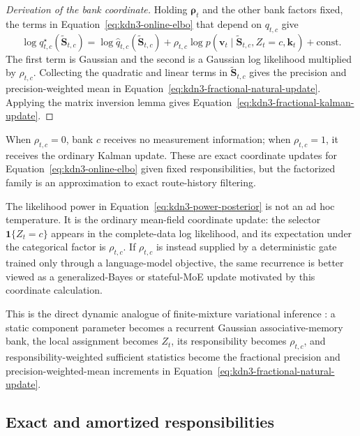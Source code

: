 \documentclass[11pt]{article}
\newcommand{\ve}[1]{\boldsymbol{#1}}
\begin{document}
\begin{proof}[Derivation of the bank coordinate]
Holding $\ve{\rho}_t$ and the other bank factors fixed, the terms in
Equation~\eqref{eq:kdn3-online-elbo} that depend on $q_{t,c}$ give
\begin{equation}
  \log q_{t,c}^{\star}(\widetilde{\ve{S}}_{t,c})
  =
  \log\widehat q_{t,c}(\widetilde{\ve{S}}_{t,c})
  +\rho_{t,c}
   \log p(\ve{v}_t\mid
     \widetilde{\ve{S}}_{t,c},Z_t=c,\ve{k}_t)
  +\mathrm{const}.
  \label{eq:kdn3-bank-coordinate-proof}
\end{equation}
The first term is Gaussian and the second is a Gaussian log likelihood multiplied by
$\rho_{t,c}$.  Collecting the quadratic and linear terms in
$\widetilde{\ve{S}}_{t,c}$ gives the precision and precision-weighted mean in
Equation~\eqref{eq:kdn3-fractional-natural-update}.  Applying the matrix inversion lemma gives
Equation~\eqref{eq:kdn3-fractional-kalman-update}.
\end{proof}

When $\rho_{t,c}=0$, bank $c$ receives no measurement information; when
$\rho_{t,c}=1$, it receives the ordinary Kalman update.  These are exact coordinate updates for
Equation~\eqref{eq:kdn3-online-elbo} given fixed responsibilities, but the factorized family is an
approximation to exact route-history filtering.

The likelihood power in Equation~\eqref{eq:kdn3-power-posterior} is not an ad hoc temperature.
It is the ordinary mean-field coordinate update: the selector
$\mathbf{1}\{Z_t=c\}$ appears in the complete-data log likelihood, and its expectation under the
categorical factor is $\rho_{t,c}$.  If $\rho_{t,c}$ is instead supplied by a deterministic gate
trained only through a language-model objective, the same recurrence is better viewed as a
generalized-Bayes or stateful-MoE update motivated by this coordinate calculation.

This is the direct dynamic analogue of finite-mixture variational inference
\cite{blei2017variational}: a static component parameter becomes a recurrent Gaussian
associative-memory bank, the local assignment becomes
$Z_t$, its responsibility becomes $\rho_{t,c}$, and responsibility-weighted sufficient statistics
become the fractional precision and precision-weighted-mean increments in
Equation~\eqref{eq:kdn3-fractional-natural-update}.

\subsection{Exact and amortized responsibilities}
\end{document}
